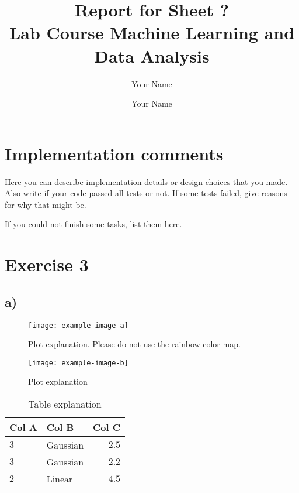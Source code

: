 \documentclass[a4paper,11pt]{article}
\begin{document}
\author{Your Name \and Your Name}
\title{\vspace{-2cm}Report for Sheet ?\\
\small{Lab Course Machine Learning and Data Analysis}}
\maketitle

\section*{Implementation comments}
Here you can describe implementation details or design choices that you made. Also write if your code passed all tests or not. If some tests failed, give reasons for why that might be.

If you could not finish some tasks, list them here.

\section*{Exercise 3}
\subsection*{a)}

\begin{figure}
  \centering
    \texttt{[image: example-image-a]}
  \caption{Plot explanation. Please do not use the rainbow color map.}
  \label{fig:myplot}
\end{figure}

\begin{figure}[htp]
\centerline{\texttt{[image: example-image-b]}}
\caption{Plot explanation}
\end{figure}

\begin{table}
  \begin{center}
    \begin{tabular}{llr}
      \toprule
      Col A & Col B & Col C\\
      \midrule
      $3$ & Gaussian & $2.5$\\
      $3$ & Gaussian & $2.2$\\
      $2$ & Linear & $4.5$\\
      \bottomrule
    \end{tabular}
  \end{center}
  \caption{Table explanation}
  \label{tab:mytable}
\end{table}
\end{document}
